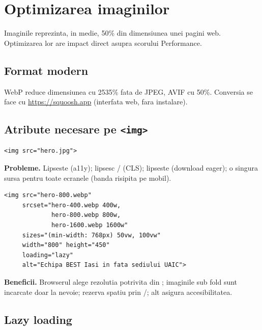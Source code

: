 \section{Optimizarea imaginilor}

Imaginile reprezinta, in medie, 50\% din dimensiunea unei pagini web. Optimizarea lor are impact direct asupra scorului Performance.

\subsection{Format modern}

WebP reduce dimensiunea cu 25\textendash{}35\% fata de JPEG, AVIF cu 50\%. Conversia se face cu \url{https://squoosh.app} (interfata web, fara instalare).

\subsection{Atribute necesare pe \texttt{<img>}}

\begin{dano}[Asa nu]
\begin{lstlisting}[style=html, numbers=none]
<img src="hero.jpg">
\end{lstlisting}
\textbf{Probleme.} Lipseste  (a11y); lipsesc / (CLS); lipseste  (download eager); o singura sursa pentru toate ecranele (banda risipita pe mobil).
\end{dano}

\begin{dado}
\begin{lstlisting}[style=html, numbers=none]
<img src="hero-800.webp"
     srcset="hero-400.webp 400w,
             hero-800.webp 800w,
             hero-1600.webp 1600w"
     sizes="(min-width: 768px) 50vw, 100vw"
     width="800" height="450"
     loading="lazy"
     alt="Echipa BEST Iasi in fata sediului UAIC">
\end{lstlisting}
\textbf{Beneficii.} Browserul alege rezolutia potrivita din ; imaginile sub fold sunt incarcate doar la nevoie; rezerva spatiu prin /; alt asigura accesibilitatea.
\end{dado}

\subsection{Lazy loading}

